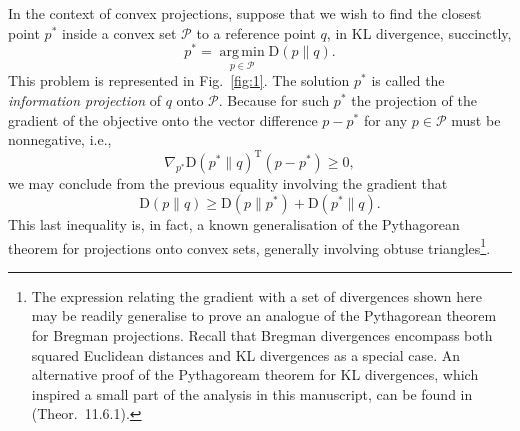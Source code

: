 In the context of convex projections, suppose that we wish to find the closest point $p^*$ inside a convex set $\mathscr{P}$ to a reference point $q$, in KL divergence, succinctly,
$$p^*=\operatorname*{arg\,min}_{p\in\mathscr{P}} \text{D}(p\|q).$$
This problem is represented in Fig.~\ref{fig:1}. The solution $p^*$ is called the \emph{information projection} of $q$ onto $\mathscr{P}$. Because for such $p^*$ the projection of the gradient of the objective onto the vector difference $p-p^*$ for any $p\in\mathscr{P}$ must be nonnegative, i.e.,
$$\nabla_{p^*}\text{D}(p^*\|q)^\text{T}(p-p^*)\geqslant 0,$$
we may conclude from the previous equality involving the gradient that
$$\text{D}(p\|q)\geqslant\text{D}(p\|p^*)+\text{D}(p^*\|q).$$
This last inequality is, in fact, a known generalisation of the Pythagorean theorem for projections onto convex sets, generally involving obtuse triangles\footnote{The expression relating the gradient with a set of divergences shown here may be readily generalise to prove an analogue of the Pythagorean theorem for Bregman projections. Recall that Bregman divergences encompass both squared Euclidean distances and KL divergences as a special case. An alternative proof of the Pythagoream theorem for KL divergences, which inspired a small part of the analysis in this manuscript, can be found in \cite{cover91b}(Theor.~11.6.1).}.

